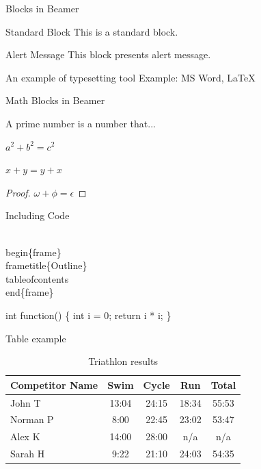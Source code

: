 \documentclass{beamer}
\begin{document}
\begin{frame}{Blocks in Beamer}
    \begin{block}{Standard Block}
        This is a standard block.
    \end{block}
    \begin{alertblock}{Alert Message}
        This block presents alert message.
    \end{alertblock}
    \begin{exampleblock}{An example of typesetting tool}
        Example: MS Word, \LaTeX{}
    \end{exampleblock}
\end{frame}

\begin{frame}{Math Blocks in Beamer}
    \begin{definition}
        A prime number is a number that...
    \end{definition}
    \begin{theorem}[Pythagoras]
        $a^2 + b^2 = c^2$
    \end{theorem}
    \begin{corollary}
        $x + y = y + x  $
    \end{corollary}
    \begin{proof}
        $\omega +\phi = \epsilon$
    \end{proof}
\end{frame}

\begin{frame}[fragile]{Including Code}
    \begin{semiverbatim}
        \\begin\{frame\}
        \\frametitle\{Outline\}
        \\tableofcontents
        \\end\{frame\}
    \end{semiverbatim}
    \begin{semiverbatim}
        int function() \{
        int i = 0;
        return i * i;
        \}
    \end{semiverbatim}
\end{frame}

\begin{frame}{Table example}
    \begin{table}
        \begin{tabular}{l | c | c | c | c }
            Competitor Name & Swim  & Cycle & Run   & Total \\
            \hline \hline
            John T          & 13:04 & 24:15 & 18:34 & 55:53 \\
            Norman P        & 8:00  & 22:45 & 23:02 & 53:47 \\
            Alex K          & 14:00 & 28:00 & n/a   & n/a   \\
            Sarah H         & 9:22  & 21:10 & 24:03 & 54:35
        \end{tabular}
        \caption{Triathlon results}
    \end{table}
\end{frame}
\end{document}
